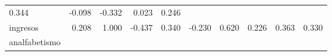 \documentclass[]{article}
\begin{document}
\begin{longtable}[]{@{}lrrrrrrrrr@{}}
\begin{minipage}[t]{0.05\columnwidth}
0.344\strut
\end{minipage} & \begin{minipage}[t]{0.07\columnwidth}\raggedleft\strut
-0.098\strut
\end{minipage} & \begin{minipage}[t]{0.06\columnwidth}\raggedleft\strut
-0.332\strut
\end{minipage} & \begin{minipage}[t]{0.05\columnwidth}\raggedleft\strut
0.023\strut
\end{minipage} & \begin{minipage}[t]{0.10\columnwidth}\raggedleft\strut
0.246\strut
\end{minipage}\tabularnewline
\begin{minipage}[t]{0.10\columnwidth}\raggedright\strut
ingresos\strut
\end{minipage} & \begin{minipage}[t]{0.08\columnwidth}\raggedleft\strut
0.208\strut
\end{minipage} & \begin{minipage}[t]{0.07\columnwidth}\raggedleft\strut
1.000\strut
\end{minipage} & \begin{minipage}[t]{0.10\columnwidth}\raggedleft\strut
-0.437\strut
\end{minipage} & \begin{minipage}[t]{0.07\columnwidth}\raggedleft\strut
0.340\strut
\end{minipage} & \begin{minipage}[t]{0.05\columnwidth}\raggedleft\strut
-0.230\strut
\end{minipage} & \begin{minipage}[t]{0.07\columnwidth}\raggedleft\strut
0.620\strut
\end{minipage} & \begin{minipage}[t]{0.06\columnwidth}\raggedleft\strut
0.226\strut
\end{minipage} & \begin{minipage}[t]{0.05\columnwidth}\raggedleft\strut
0.363\strut
\end{minipage} & \begin{minipage}[t]{0.10\columnwidth}\raggedleft\strut
0.330\strut
\end{minipage}\tabularnewline
\begin{minipage}[t]{0.10\columnwidth}\raggedright\strut
analfabetismo\strut
\end{minipage} & \begin{minipage}[t]{0.08\columnwidth}\raggedleft\strut

\end{minipage}
\end{longtable}
\end{document}
